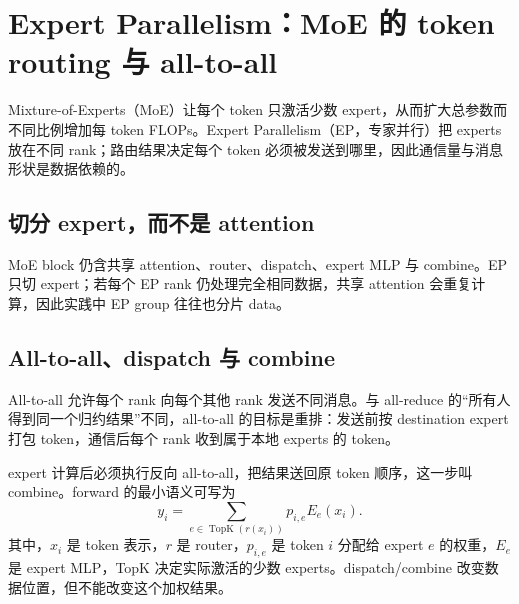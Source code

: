 \section{Expert Parallelism：MoE 的 token routing 与 all-to-all}

Mixture-of-Experts（MoE）让每个 token 只激活少数 expert，从而扩大总参数而不同比例增加每 token FLOPs。Expert Parallelism（EP，专家并行）把 experts 放在不同 rank；路由结果决定每个 token 必须被发送到哪里，因此通信量与消息形状是数据依赖的。

\subsection{切分 expert，而不是 attention}

MoE block 仍含共享 attention、router、dispatch、expert MLP 与 combine。EP 只切 expert；若每个 EP rank 仍处理完全相同数据，共享 attention 会重复计算，因此实践中 EP group 往往也分片 data。




\subsection{All-to-all、dispatch 与 combine}

All-to-all 允许每个 rank 向每个其他 rank 发送不同消息。与 all-reduce 的“所有人得到同一个归约结果”不同，all-to-all 的目标是重排：发送前按 destination expert 打包 token，通信后每个 rank 收到属于本地 experts 的 token。



expert 计算后必须执行反向 all-to-all，把结果送回原 token 顺序，这一步叫 combine。forward 的最小语义可写为
\[
y_i=\sum_{e\in\operatorname{TopK}(r(x_i))}p_{i,e}E_e(x_i).
\]
其中，$x_i$ 是 token 表示，$r$ 是 router，$p_{i,e}$ 是 token $i$ 分配给 expert $e$ 的权重，$E_e$ 是 expert MLP，TopK 决定实际激活的少数 experts。dispatch/combine 改变数据位置，但不能改变这个加权结果。

